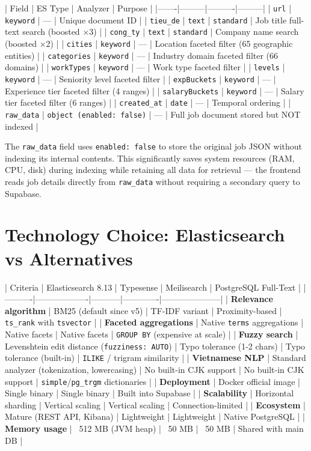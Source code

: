 | Field | ES Type | Analyzer | Purpose |
|-------|---------|----------|---------|
| \texttt{url} | \texttt{keyword} | — | Unique document ID |
| \texttt{tieu\_de} | \texttt{text} | \texttt{standard} | Job title full-text search (boosted ×3) |
| \texttt{cong\_ty} | \texttt{text} | \texttt{standard} | Company name search (boosted ×2) |
| \texttt{cities} | \texttt{keyword} | — | Location faceted filter (65 geographic entities) |
| \texttt{categories} | \texttt{keyword} | — | Industry domain faceted filter (66 domains) |
| \texttt{workTypes} | \texttt{keyword} | — | Work type faceted filter |
| \texttt{levels} | \texttt{keyword} | — | Seniority level faceted filter |
| \texttt{expBuckets} | \texttt{keyword} | — | Experience tier faceted filter (4 ranges) |
| \texttt{salaryBuckets} | \texttt{keyword} | — | Salary tier faceted filter (6 ranges) |
| \texttt{created\_at} | \texttt{date} | — | Temporal ordering |
| \texttt{raw\_data} | \texttt{object (enabled: false)} | — | Full job document stored but NOT indexed |

The \texttt{raw\_data} field uses \texttt{enabled: false} to store the original job JSON without indexing its internal contents. This significantly saves system resources (RAM, CPU, disk) during indexing while retaining all data for retrieval — the frontend reads job details directly from \texttt{raw\_data} without requiring a secondary query to Supabase.

\section{Technology Choice: Elasticsearch vs Alternatives}

| Criteria | Elasticsearch 8.13 | Typesense | Meilisearch | PostgreSQL Full-Text |
|----------|-------------------|-----------|-------------|---------------------|
| \textbf{Relevance algorithm} | BM25 (default since v5) | TF-IDF variant | Proximity-based | \texttt{ts\_rank} with \texttt{tsvector} |
| \textbf{Faceted aggregations} | Native \texttt{terms} aggregations | Native facets | Native facets | \texttt{GROUP BY} (expensive at scale) |
| \textbf{Fuzzy search} | Levenshtein edit distance (\texttt{fuzziness: AUTO}) | Typo tolerance (1-2 chars) | Typo tolerance (built-in) | \texttt{ILIKE} / trigram similarity |
| \textbf{Vietnamese NLP} | Standard analyzer (tokenization, lowercasing) | No built-in CJK support | No built-in CJK support | \texttt{simple}/\texttt{pg\_trgm} dictionaries |
| \textbf{Deployment} | Docker official image | Single binary | Single binary | Built into Supabase |
| \textbf{Scalability} | Horizontal sharding | Vertical scaling | Vertical scaling | Connection-limited |
| \textbf{Ecosystem} | Mature (REST API, Kibana) | Lightweight | Lightweight | Native PostgreSQL |
| \textbf{Memory usage} | ~512 MB (JVM heap) | ~50 MB | ~50 MB | Shared with main DB |

